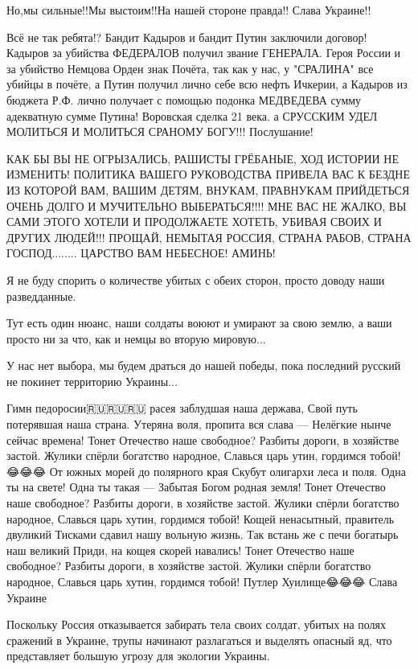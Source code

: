 Но,мы сильные!!Мы выстоим!!На нашей стороне правда!!  Слава Украине!!

Всё не так ребята!? Бандит Кадыров и бандит Путин заключили договор! Кадыров за
убийства ФЕДЕРАЛОВ получил звание ГЕНЕРАЛА. Героя России и за убийство Немцова
Орден знак Почёта, так как у нас, у "СРАЛИНА" все убийцы в почёте, а Путин
получил лично себе всю нефть Ичкерии, а Кадыров из бюджета Р.Ф. лично получает
с помощью подонка МЕДВЕДЕВА сумму адекватную сумме Путина! Воровская сделка 21
века. а СРУССКИМ УДЕЛ МОЛИТЬСЯ И МОЛИТЬСЯ СРАНОМУ БОГУ!!! Послушание!

КАК БЫ ВЫ НЕ ОГРЫЗАЛИСЬ, РАШИСТЫ ГРЁБАНЫЕ, ХОД ИСТОРИИ НЕ ИЗМЕНИТЬ! ПОЛИТИКА ВАШЕГО РУКОВОДСТВА ПРИВЕЛА ВАС К БЕЗДНЕ ИЗ КОТОРОЙ ВАМ, ВАШИМ ДЕТЯМ, ВНУКАМ, ПРАВНУКАМ ПРИЙДЕТЬСЯ ОЧЕНЬ ДОЛГО И МУЧИТЕЛЬНО ВЫБЕРАТЬСЯ!!!!
МНЕ ВАС НЕ ЖАЛКО, ВЫ САМИ ЭТОГО ХОТЕЛИ И ПРОДОЛЖАЕТЕ ХОТЕТЬ, УБИВАЯ СВОИХ И ДРУГИХ ЛЮДЕЙ!!!
ПРОЩАЙ, НЕМЫТАЯ РОССИЯ, СТРАНА РАБОВ, СТРАНА ГОСПОД........
ЦАРСТВО ВАМ НЕБЕСНОЕ! АМИНЬ! 

Я не буду спорить о количестве убитых с обеих сторон, просто доводу наши
разведданные.

Тут есть один нюанс, наши солдаты воюют и умирают за свою землю, а ваши просто
ни за что, как и немцы во вторую мировую...

У нас нет выбора, мы будем драться до нашей победы, пока последний русский не
покинет территорию Украины...

Гимн педоросии🇷🇺🇷🇺🇷🇺
расея заблудшая наша держава,
Свой путь потерявшая наша страна.
Утеряна воля, пропита вся слава —
Нелёгкие нынче сейчас времена!
Тонет Отечество наше свободное?
Разбиты дороги, в хозяйстве застой.
Жулики спёрли богатство народное,
Славься царь утин, гордимся тобой!😂😂😂
От южных морей до полярного края
Скубут олигархи леса и поля.
Одна ты на свете! Одна ты такая —
Забытая Богом родная земля!
Тонет Отечество наше свободное?
Разбиты дороги, в хозяйстве застой.
Жулики спёрли богатство народное,
Славься царь хутин, гордимся тобой!
Кощей ненасытный, правитель двуликий
Тисками сдавил нашу вольную жизнь.
Так встань же с печи богатырь наш великий
Приди, на кощея скорей навались!
Тонет Отечество наше свободное?
Разбиты дороги, в хозяйстве застой.
Жулики спёрли богатство народное,
Славься царь хутин, гордимся тобой! Путлер Хуилище😂😂😂 Слава Украине 

Поскольку Россия отказывается забирать тела своих солдат, убитых на полях
сражений в Украине, трупы начинают разлагаться и выделять опасный яд, что
представляет большую угрозу для экологии Украины.


